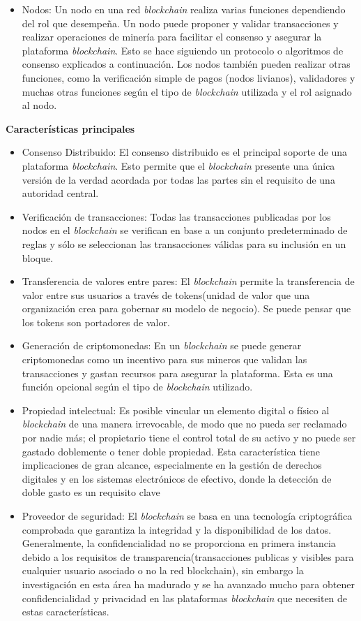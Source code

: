 \begin{itemize}
    \item Nodos: Un nodo en una red \textit{blockchain} realiza varias funciones dependiendo del rol que desempeña. Un nodo puede proponer y validar transacciones y realizar operaciones de minería para facilitar el consenso y asegurar la plataforma \textit{blockchain}. Esto se hace siguiendo un protocolo o algoritmos de consenso explicados a continuación. Los nodos también pueden realizar otras funciones, como la verificación simple de pagos (nodos livianos), validadores y muchas otras funciones según el tipo de \textit{blockchain} utilizada y el rol asignado al nodo.
\end{itemize}

\textbf{Características principales}
\begin{itemize}
    \item Consenso Distribuido: El consenso distribuido es el principal soporte de una plataforma \textit{blockchain}. Esto permite que el \textit{blockchain} presente una única versión de la verdad acordada por todas las partes sin el requisito de una autoridad central.
    \item Verificación de transacciones: Todas las transacciones publicadas por los  nodos en el \textit{blockchain} se verifican en base a un conjunto predeterminado de reglas y sólo se seleccionan las transacciones válidas para su inclusión en un bloque.
    \item Transferencia de valores entre pares: El \textit{blockchain} permite la transferencia de valor entre sus usuarios a través de tokens(unidad de valor que una organización crea para gobernar su modelo de negocio). Se puede pensar que los tokens son portadores de valor.
    \item Generación de criptomonedas: En un \textit{blockchain} se  puede generar criptomonedas como un incentivo para sus mineros que validan las transacciones y gastan recursos para asegurar la plataforma. Esta es una función opcional según el tipo de \textit{blockchain} utilizado.
    \item Propiedad intelectual: Es posible vincular un elemento digital o físico al \textit{blockchain} de una manera irrevocable, de modo que no pueda ser reclamado por nadie más; el propietario tiene el control total de su activo y no puede ser gastado doblemente o tener doble propiedad. Esta característica tiene implicaciones de gran alcance, especialmente en la gestión de derechos digitales y en los sistemas electrónicos de efectivo, donde la detección de doble gasto es un requisito clave
    \item Proveedor de seguridad: El \textit{blockchain} se basa en una tecnología criptográfica comprobada que garantiza la integridad y la disponibilidad de los datos. Generalmente, la confidencialidad no se proporciona en primera instancia debido a los requisitos de transparencia(transacciones publicas y visibles para cualquier usuario asociado o no la red blockchain), sin embargo la investigación en esta área ha  madurado y se ha avanzado mucho para obtener confidencialidad y privacidad en las plataformas \textit{blockchain} que necesiten de estas características.

\end{itemize}
